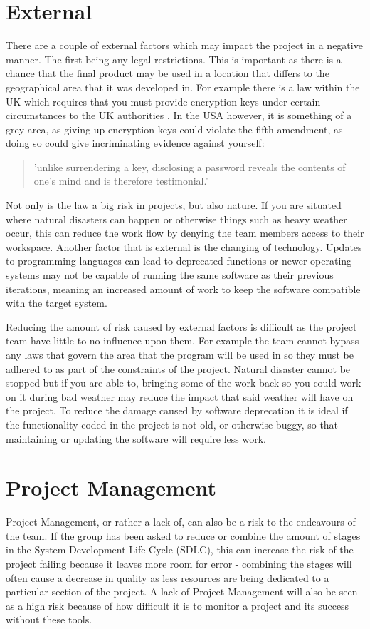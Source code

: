 \section{External}
There are a couple of external factors which may impact the project in a
negative manner.  The first being any legal restrictions.  This is important as
there is a chance that the final product may be used in a location that differs
to the geographical area that it was developed in.  For example there is a law
within the UK which requires that you must provide encryption keys under certain
circumstances to the UK authorities \cite{ripaIII}\cite{ukCryptLaw}. In the USA
however, it is something of a grey-area, as giving up encryption keys could
violate the fifth amendment, as doing so could give incriminating evidence
against yourself:

\begin{quote}
'unlike surrendering a key, disclosing a password reveals the contents of one’s mind and
is therefore testimonial.' \cite{usCryptLaw}
\end{quote}

Not only is the law a big risk in projects, but also nature.  If you are
situated where natural disasters can happen or otherwise things such as heavy
weather occur, this can reduce the work flow by denying the team members access
to their workspace.  Another factor that is external is the changing of
technology.  Updates to programming languages can lead to deprecated functions
or newer operating systems may not be capable of running the same software as
their previous iterations, meaning an increased amount of work to keep the
software compatible with the target system.

Reducing the amount of risk caused by external factors is difficult as the
project team have little to no influence upon them.  For example the team cannot
bypass any laws that govern the area that the program will be used in so they
must be adhered to as part of the constraints of the project.  Natural disaster
cannot be stopped but if you are able to, bringing some of the work back so you
could work on it during bad weather may reduce the impact that said weather will
have on the project.  To reduce the damage caused by software deprecation it is
ideal if the functionality coded in the project is not old, or otherwise buggy,
so that maintaining or updating the software will require less work.

\section{Project Management}
Project Management, or rather a lack of, can also be a risk to the endeavours of
the team.  If the group has been asked to reduce or combine the amount of stages
in the System Development Life Cycle (SDLC), this can increase the risk of the
project failing because it leaves more room for error - combining the stages
will often cause a decrease in quality as less resources are being dedicated to
a particular section of the project.  A lack of Project Management will also be
seen as a high risk because of how difficult it is to monitor a project and its
success without these tools.

